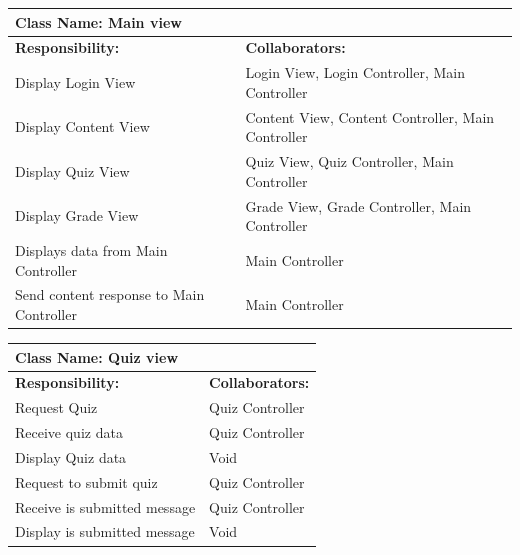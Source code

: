 \documentclass[]{article}
\begin{document}
	\begin{table}[H]
	\centering
		\begin{tabular}{|p{9cm}|p{3cm}|}
		\hline
		 \multicolumn{2}{|l|}{\textbf{Class Name: Main view}} \\
		\hline
		\textbf{Responsibility:} & \textbf{Collaborators:} \\
		\hline
	    Display Login View & Login View, Login Controller, Main Controller\\
		\hline
		Display Content View & Content View, Content Controller, Main Controller \\
		\hline
		Display Quiz View & Quiz View, Quiz Controller, Main Controller\\
		\hline
		Display Grade View & Grade View, Grade Controller, Main Controller\\
		\hline 
		Displays data from Main Controller & Main Controller\\
		\hline
		Send content response to Main Controller & Main Controller\\
		\hline
		\end{tabular}
	\end{table}
	
	\begin{table}[H]
	\centering
		\begin{tabular}{|p{9cm}|p{3cm}|}
		\hline
		 \multicolumn{2}{|l|}{\textbf{Class Name: Quiz view}} \\
		\hline
		\textbf{Responsibility:} & \textbf{Collaborators:} \\
		\hline
		Request Quiz & Quiz Controller\\
		\hline
	    Receive quiz data & Quiz Controller\\
	    \hline
	    Display Quiz data & Void\\
	    \hline 
	    Request to submit quiz & Quiz Controller\\
	    \hline
	    Receive is submitted message & Quiz Controller\\
	    \hline
	    Display is submitted message & Void\\
	    \hline
		\end{tabular}
	\end{table}
	
\end{document}
